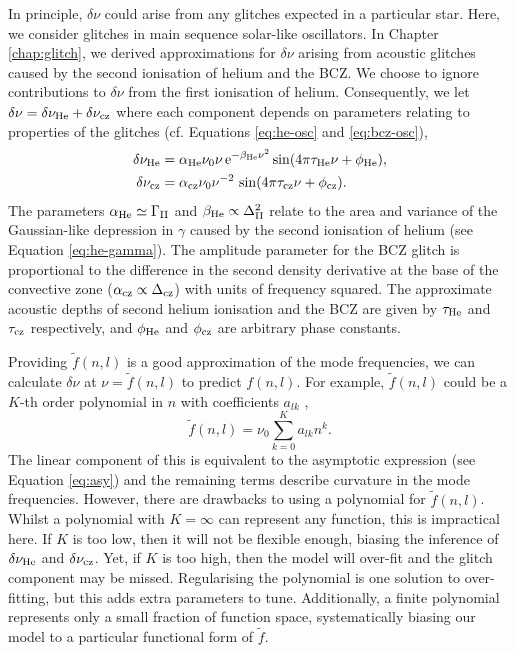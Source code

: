 In principle, \(\delta\nu\) could arise from any glitches expected in a particular star. Here, we consider glitches in main sequence solar-like oscillators. In Chapter \ref{chap:glitch}, we derived approximations for \(\delta\nu\) arising from acoustic glitches caused by the second ionisation of helium and the BCZ. We choose to ignore contributions to \(\delta\nu\) from the first ionisation of helium. Consequently, we let \(\delta\nu = \delta\nu_{{\mathrm{He}}} + \delta\nu_{{\mathrm{cz}}}\) where each component depends on parameters relating to properties of the glitches (cf. Equations \ref{eq:he-osc} and \ref{eq:bcz-osc}),
%
\begin{align}
    \delta\nu_{{\mathrm{He}}} &= \alpha_{{\mathrm{He}}} \nu_0 \nu \, \mathrm{e}^{-\beta_{{\mathrm{He}}} \nu^2} \sin(4\pi\tau_{{\mathrm{He}}}\nu + \phi_{{\mathrm{He}}}), \label{eq:he-glitch}\\
    \delta\nu_{{\mathrm{cz}}} &= \alpha_{{\mathrm{cz}}} \nu_0 \nu^{-2} \, \sin(4\pi\tau_{{\mathrm{cz}}}\nu + \phi_{{\mathrm{cz}}}). \label{eq:bcz-glitch}
\end{align}
%
The parameters \(\alpha_{{\mathrm{He}}} \simeq \Gamma_{{\mathrm{II}}}\) and \(\beta_{{\mathrm{He}}} \propto \Delta_{{\mathrm{II}}}^2\) relate to the area and variance of the Gaussian-like depression in \(\gamma\) caused by the second ionisation of helium (see Equation \ref{eq:he-gamma}). The amplitude parameter for the BCZ glitch is proportional to the difference in the second density derivative at the base of the convective zone (\(\alpha_{{\mathrm{cz}}} \propto \Delta_{{\mathrm{cz}}}\)) with units of frequency squared. The approximate acoustic depths of second helium ionisation and the BCZ are given by \(\tau_{{\mathrm{He}}}\) and \(\tau_{{\mathrm{cz}}}\) respectively, and \(\phi_{{\mathrm{He}}}\) and \(\phi_{{\mathrm{cz}}}\) are arbitrary phase constants.

Providing \(\tilde{f}(n, l)\) is a good approximation of the mode frequencies, we can calculate \(\delta\nu\) at \(\nu = \tilde{f}(n, l)\) to predict \(f(n, l)\). For example, \(\tilde{f}(n,l)\) could be a \(K\)-th order polynomial in \(n\) with coefficients \(a_{lk}\) \citep[e.g.][]{Kjeldsen.Bedding.ea2005,Ulrich1986},
%
\begin{equation}
    \tilde{f}(n, l) = \nu_0 \sum_{k=0}^{K} a_{lk} n^k. \label{eq:poly}
\end{equation}
%
The linear component of this is equivalent to the asymptotic expression (see Equation \ref{eq:asy}) and the remaining terms describe curvature in the mode frequencies. However, there are drawbacks to using a polynomial for \(\tilde{f}(n, l)\). Whilst a polynomial with \(K = \infty\) can represent any function, this is impractical here. If \(K\) is too low, then it will not be flexible enough, biasing the inference of \(\delta\nu_{{\mathrm{He}}}\) and \(\delta\nu_{{\mathrm{cz}}}\). Yet, if \(K\) is too high, then the model will over-fit and the glitch component may be missed. Regularising the polynomial is one solution to over-fitting, but this adds extra parameters to tune. Additionally, a finite polynomial represents only a small fraction of function space, systematically biasing our model to a particular functional form of \(\tilde{f}\).

